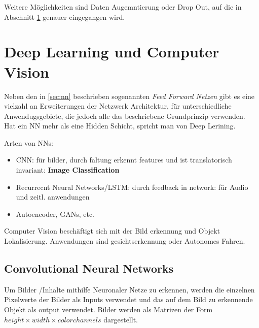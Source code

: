Weitere Möglichkeiten sind Daten Augemntierung oder Drop Out, auf die 
in Abschnitt \ref{sec:deepl_cv} genauer eingegangen wird.



\section{Deep Learning und Computer Vision}\label{sec:deepl_cv}



Neben den in \ref{sec:nn} beschrieben sogenannten \textit{Feed Forward Netzen} 
gibt es eine vielzahl an Erweiterungen der Netzwerk Architektur, für unterschiedliche 
Anwendugsgebiete, die jedoch alle das beschriebene Grundprinzip verwenden.\\

Hat ein NN mehr als eine Hidden Schicht, spricht man von Deep Lerining.

Arten von NNs:
\begin{itemize}
    \item CNN: für bilder, durch faltung erkennt features und ist translatorisch invariant: \textbf{Image Classification}
    \item Recurrecnt Neural Networks/LSTM: durch feedback in network: für Audio und zeitl. anwendungen 
    \item Autoencoder, GANs, etc.
\end{itemize}

Computer Vision beschäftigt sich mit der Bild erkennung und Objekt Lokalisierung. 
Anwendungen sind gesichtserkennung oder Autonomes Fahren. 




\subsection{Convolutional Neural Networks}

Um Bilder /Inhalte mithilfe Neuronaler Netze zu erkennen, 
werden die einzelnen Pixelwerte der Bilder als Inputs verwendet 
und das auf dem Bild zu erkennende Objekt als output verwendet. Bilder 
werden als Matrizen der Form $height\times width \times color channels$ 
dargestellt.

